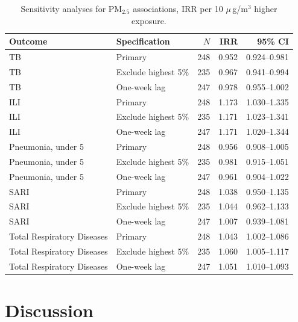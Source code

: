 \documentclass[12pt,a4paper]{report}
\newcommand{\pmfive}{PM$_{2.5}$}
\newcommand{\ugm}{\ensuremath{\mu}\,g/m$^3$}
\begin{document}
\begin{table}[htbp]
\centering
\caption{Sensitivity analyses for \pmfive{} associations, IRR per 10 \ugm{} higher exposure.}
\label{tab:sensitivity}
\begin{tabular}{llrrr}
\toprule
Outcome & Specification & $N$ & IRR & 95\% CI \\
\midrule
TB & Primary & 248 & 0.952 & 0.924--0.981 \\
TB & Exclude highest 5\% & 235 & 0.967 & 0.941--0.994 \\
TB & One-week lag & 247 & 0.978 & 0.955--1.002 \\
ILI & Primary & 248 & 1.173 & 1.030--1.335 \\
ILI & Exclude highest 5\% & 235 & 1.171 & 1.023--1.341 \\
ILI & One-week lag & 247 & 1.171 & 1.020--1.344 \\
Pneumonia, under 5 & Primary & 248 & 0.956 & 0.908--1.005 \\
Pneumonia, under 5 & Exclude highest 5\% & 235 & 0.981 & 0.915--1.051 \\
Pneumonia, under 5 & One-week lag & 247 & 0.961 & 0.904--1.022 \\
SARI & Primary & 248 & 1.038 & 0.950--1.135 \\
SARI & Exclude highest 5\% & 235 & 1.044 & 0.962--1.133 \\
SARI & One-week lag & 247 & 1.007 & 0.939--1.081 \\
Total Respiratory Diseases & Primary & 248 & 1.043 & 1.002--1.086 \\
Total Respiratory Diseases & Exclude highest 5\% & 235 & 1.060 & 1.005--1.117 \\
Total Respiratory Diseases & One-week lag & 247 & 1.051 & 1.010--1.093 \\
\bottomrule
\end{tabular}
\end{table}

\chapter{Discussion}
\end{document}
